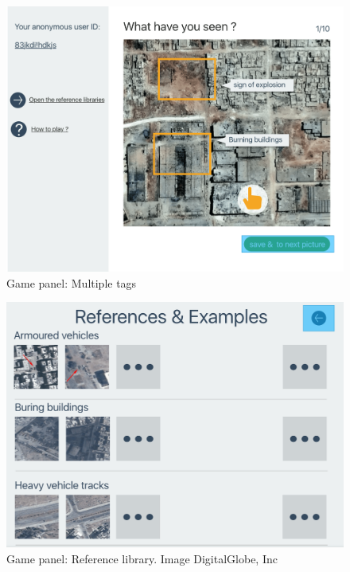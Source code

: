       \noindent\begin{minipage}{.45\textwidth}
      \begin{figure}[H]
      \centering
      \includegraphics[width=\textwidth]{figures/function-player-2}
      \caption{Game panel: Multiple tags \cite{satellite-photo-1}}
      \label{fig:player2}
      \end{figure}
      \end{minipage}\hfill
      \noindent\begin{minipage}{.45\textwidth}
      \begin{figure}[H]
      \centering
      \includegraphics[width=\textwidth]{figures/function-player-3}
      \caption{Game panel: Reference library. Image \textcopyright DigitalGlobe, Inc}
      \label{fig:player3}
      \end{figure}
      \end{minipage}\hfill

